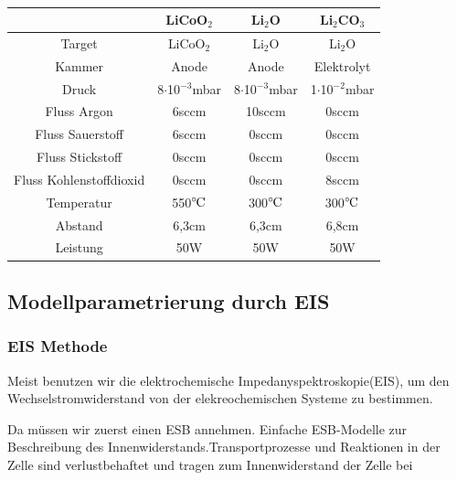 \documentclass[12pt,UTF8]{article}
\def\celsius{\ensuremath{^\circ\hspace{-0.09em}\mathrm{C}}}
\begin{document}
\begin{table}[H]
    \centering
    \caption{}
    \begin{tabular}{cccc}
        \midrule
                                & LiCoO$_2$             & Li$_2$O               & Li$_2$CO$_3$          \\
        \toprule
        Target                  & LiCoO$_2$             & Li$_2$O               & Li$_2$O               \\
        Kammer                  & Anode                 & Anode                 & Elektrolyt            \\
        Druck                   & 8$\cdot$10$^{-3}$mbar & 8$\cdot$10$^{-3}$mbar & 1$\cdot$10$^{-2}$mbar \\
        Fluss Argon             & 6sccm                 & 10sccm                & 0sccm                 \\
        Fluss Sauerstoff        & 6sccm                 & 0sccm                 & 0sccm                 \\
        Fluss Stickstoff        & 0sccm                 & 0sccm                 & 0sccm                 \\
        Fluss Kohlenstoffdioxid & 0sccm                 & 0sccm                 & 8sccm                 \\
        Temperatur              & 550\celsius           & 300\celsius           & 300\celsius           \\
        Abstand                 & 6,3cm                 & 6,3cm                 & 6,8cm                 \\
        Leistung                & 50W                   & 50W                   & 50W                   \\
        \midrule
    \end{tabular}
\end{table}

\subsection{Modellparametrierung durch EIS}
\subsubsection{EIS Methode}
Meist benutzen wir die elektrochemische Impedanyspektroskopie(EIS), um den Wechselstromwiderstand von der elekreochemischen Systeme zu bestimmen.

Da müssen wir zuerst einen ESB annehmen. Einfache ESB-Modelle zur Beschreibung des Innenwiderstands.Transportprozesse und Reaktionen in der Zelle sind verlustbehaftet und tragen zum Innenwiderstand  der Zelle bei
\end{document}

